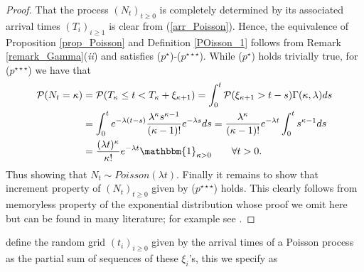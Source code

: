 \begin{proof}
That the process $(N_t)_{t \geq 0}$ is completely determined by its associated arrival times $(T_i)_{i \geq 1}$ is clear from (\ref{arr_Poisson}). Hence, the equivalence of Proposition \ref{prop_Poisson} and Definition \ref{POisson_1} follows from Remark \ref{remark_Gamma}(\textit{ii}) and satisfies ($p^{\star}$)-($p^{\star \star \star}$). While ($p^{\star}$) holds trivially true, for ($p^{\star \star \star}$) we have that 
\begin{align*}
\mathcal{P}(N_t = \kappa) &= \mathcal{P}(T_{\kappa} \leq t < T_{\kappa} + \xi_{\kappa + 1} )= \int_0^t \mathcal{P}(\xi_{\kappa + 1}> t-s) \Gamma(\kappa,\lambda) ds\\
&= \int_0^t e^{-\lambda (t-s)}\dfrac{\lambda^{\kappa} s^{\kappa-1} }{ (\kappa-1)!}e^{-\lambda s} ds = \dfrac{\lambda^{\kappa} }{ (\kappa-1)!}e^{-\lambda t} \int_0^t  s^{\kappa-1} ds\\
&= \dfrac{(\lambda t)^{\kappa} }{\kappa!}e^{-\lambda t}\mathbbm{1}_{\kappa > 0} \qquad \forall t>0.
\end{align*}
Thus showing that $ N_t \sim Poisson(\lambda t)$. Finally it remains to show that increment property of  $(N_t)_{t \geq 0}$ given by ($p^{\star \star \star}$) holds. This clearly follows from memoryless property of the exponential distribution whose proof we omit here but can be found in many literature; for example see .  
\end{proof}


define the random grid $(t_{i})_{i \geq 0}$ given by the arrival times of a Poisson process as the partial sum of sequences of these $\xi_{i}$'s, this we specify as 
